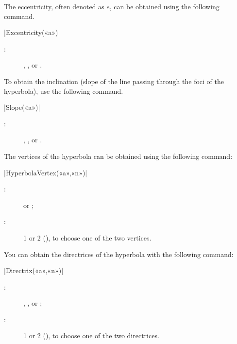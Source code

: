 \documentclass[a4paper,english]{article}
\begin{document}
The eccentricity, often denoted as $e$, can be obtained using the following command.

\begin{colourband}
\macro|Excentricity(«a»)|
\begin{description}
  \item[:]  , , or .
\end{description}
\end{colourband}
\bigskip


To obtain the inclination (slope of the line passing through the foci of the hyperbola), use the following command.

\begin{colourband}
\macro|Slope(«a»)|
\begin{description}
  \item[:]  , , or .
  \end{description}
\end{colourband}
\bigskip


The vertices of the hyperbola can be obtained using the following command:

\begin{colourband}
\macro|HyperbolaVertex(«a»,«n»)|
\begin{description}
  \item[:]   or ;
  \item[:]  1 or 2 (), to choose one of the two vertices.
\end{description}
\end{colourband}
\bigskip

You can obtain the directrices of the hyperbola with the following command:

\begin{colourband}
\macro|Directrix(«a»,«n»)|
\begin{description}
  \item[:]  , , or 
  ; 
  \item[:]  1 or 2 (), to choose one of the two
  directrices. 
\end{description}
\end{colourband}
\bigskip
\end{document}
